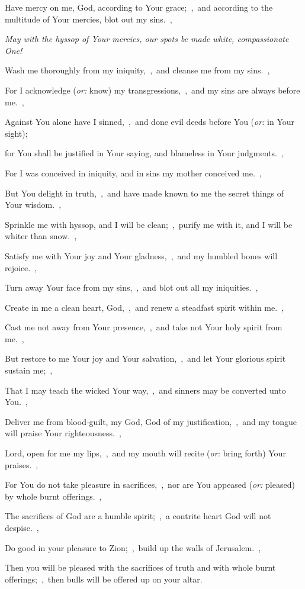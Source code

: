 \documentclass[12pt,twoside,a5paper]{article}
\newcommand{\qanona}[1]{{\liturgicalhint{Qanona.} \emph{#1}}}
\newcommand{\translationoption}[1]{\emph{or:} #1}
\begin{document}
\begin{normalparskip}
  Have mercy on me, God, according to Your grace;~\sep\ and according to the multitude of Your mercies, blot out my sins.~\sep

  \qanona{May with the hyssop of Your mercies, our spots be made white, compassionate One!}

  Wash me thoroughly from my iniquity,~\sep\ and cleanse me from my sins.~\sep

  For I acknowledge (\translationoption{know}) my transgressions,~\sep\ and my sins are always before me.~\sep

  Against You alone have I sinned,~\sep\ and done evil deeds before You (\translationoption{in Your sight});

  for You shall be justified in Your saying, and blameless in Your judgments.~\sep

  For I was conceived in iniquity, and in sins my mother conceived me.~\sep

  But You delight in truth,~\sep\ and have made known to me the secret things of Your wisdom.~\sep

  Sprinkle me with hyssop, and I will be clean;~\sep\ purify me with it, and I will be whiter than snow.~\sep

  Satisfy me with Your joy and Your gladness,~\sep\ and my humbled bones will rejoice.~\sep

  Turn away Your face from my sins,~\sep\ and blot out all my iniquities.~\sep

  Create in me a clean heart, God,~\sep\ and renew a steadfast spirit within me.~\sep

  Cast me not away from Your presence,~\sep\ and take not Your holy spirit from me.~\sep

  But restore to me Your joy and Your salvation,~\sep\ and let Your glorious spirit sustain me;~\sep

  That I may teach the wicked Your way,~\sep\ and sinners may be converted unto You.~\sep

  Deliver me from blood-guilt, my God, God of my justification,~\sep\ and my tongue will praise Your righteousness.~\sep

  Lord, open for me my lips,~\sep\ and my mouth will recite (\translationoption{bring forth}) Your praises.~\sep

  For You do not take pleasure in sacrifices,~\sep\ nor are You appeased (\translationoption{pleased}) by whole burnt offerings.~\sep

  The sacrifices of God are a humble spirit;~\sep\ a contrite heart God will not despise.~\sep

  Do good in your pleasure to Zion;~\sep\ build up the walls of Jerusalem.~\sep

  Then you will be pleased with the sacrifices of truth and with whole burnt offerings;~\sep\ then bulls will be offered up on your altar.
\end{normalparskip}
\end{document}
